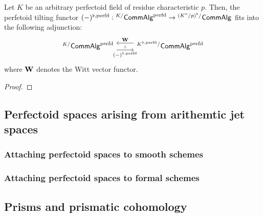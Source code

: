                 \begin{proposition} \label{prop: witt_tilt_adjunction}
                    Let $K$ be an arbitrary perfectoid field of residue characteristic $p$. Then, the perfetoid tilting functor $(-)^{\flat, \mathrm{perfd}}: {}^{K/}\mathsf{Comm}\mathsf{Alg}^{\mathrm{perfd}} \to {}^{(K^{\circ}/p)^{\flat}/}\mathsf{Comm}\mathsf{Alg}$ fits into the following adjunction:
                        $$
                            \begin{tikzcd}
                            	{{}^{K/}\Comm\Alg^{\perfd}} & {{}^{K^{\flat, \perfd}/}\Comm\Alg^{\perfd}}
                            	\arrow[""{name=0, anchor=center, inner sep=0}, "{(-)^{\flat, \perfd}}"', shift right=2, from=1-1, to=1-2]
                            	\arrow[""{name=1, anchor=center, inner sep=0}, "\W"', shift right=2, from=1-2, to=1-1]
                            	\arrow["\dashv"{anchor=center, rotate=-90}, draw=none, from=1, to=0]
                            \end{tikzcd}
                        $$
                    where $\mathbf{W}$ denotes the Witt vector functor.
                \end{proposition}
                    \begin{proof}
                        
                    \end{proof}
                    
        \subsection{Perfectoid spaces arising from arithemtic jet spaces}
                
            \subsubsection{Attaching perfectoid spaces to smooth schemes}
                
            \subsubsection{Attaching perfectoid spaces to formal schemes}
            
        \subsection{Prisms and prismatic cohomology}
        
